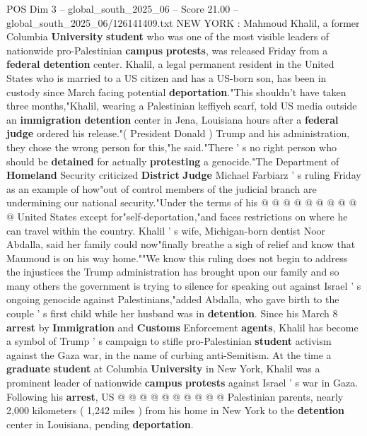 \begin{textsample}{POS Dim 3 – global\_south\_2025\_06 – Score 21.00 – global\_south\_2025\_06/126141409.txt}  \label{ex:f3_pos_202}
NEW YORK : Mahmoud Khalil, a former Columbia \textbf{University} \textbf{student} who was one of the most visible leaders of nationwide pro-Palestinian \textbf{campus} \textbf{protests}, was released Friday from a \textbf{federal} \textbf{detention} center.
Khalil, a legal permanent resident in the United States who is married to a US citizen and has a US-born son, has been in custody since March facing potential \textbf{deportation}."This shouldn't have taken three months,"Khalil, wearing a Palestinian keffiyeh scarf, told US media outside an \textbf{immigration} \textbf{detention} center in Jena, Louisiana hours after a \textbf{federal} \textbf{judge} ordered his release."( President Donald ) Trump and his administration, they chose the wrong person for this,"he said."There ' s no right person who should be \textbf{detained} for actually \textbf{protesting} a genocide."The Department of \textbf{Homeland} Security criticized \textbf{District} \textbf{Judge} Michael Farbiarz ' s ruling Friday as an example of how"out of control members of the judicial branch are undermining our national security."Under the terms of his @ @ @ @ @ @ @ @ @ @ United States except for"self-deportation,"and faces restrictions on where he can travel within the country.
Khalil ' s wife, Michigan-born dentist Noor Abdalla, said her family could now"finally breathe a sigh of relief and know that Maumoud is on his way home.""We know this ruling does not begin to address the injustices the Trump administration has brought upon our family and so many others the government is trying to silence for speaking out against Israel ' s ongoing genocide against Palestinians,"added Abdalla, who gave birth to the couple ' s first child while her husband was in \textbf{detention}.
Since his March 8 \textbf{arrest} by \textbf{Immigration} and \textbf{Customs} Enforcement \textbf{agents}, Khalil has become a symbol of Trump ' s campaign to stifle pro-Palestinian \textbf{student} activism against the Gaza war, in the name of curbing anti-Semitism.
At the time a \textbf{graduate} \textbf{student} at Columbia \textbf{University} in New York, Khalil was a prominent leader of nationwide \textbf{campus} \textbf{protests} against Israel ' s war in Gaza.
Following his \textbf{arrest}, US @ @ @ @ @ @ @ @ @ @ Palestinian parents, nearly 2,000 kilometers ( 1,242 miles ) from his home in New York to the \textbf{detention} center in Louisiana, pending \textbf{deportation}.

\end{textsample}
